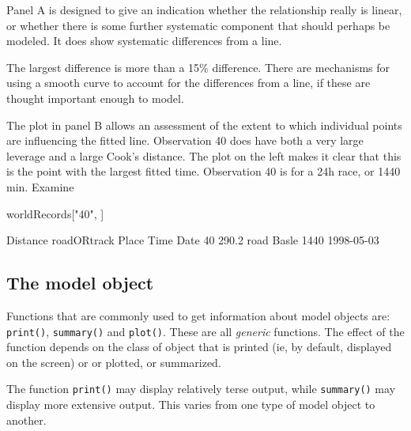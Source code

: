 \documentclass{tufte-book}\usepackage[]{graphicx}\usepackage[]{color}
\newcommand{\txtt}[1]{\texttt{#1}}
\begin{document}
Panel A is designed
to give an indication whether the relationship really is linear, or
whether there is some further systematic component that should perhaps
be modeled.  It does show systematic differences from a line.

The largest difference is more than a 15\% difference. There are
mechanisms for using a smooth curve to account for the differences
from a line, if these are thought important enough to model.

The plot in panel B allows an assessment of the extent to which individual
points are influencing the fitted line.  Observation 40 does have both
a very large leverage and a large Cook's distance.  The plot on the
left makes it clear that this is the point with the largest fitted
time. Observation 40 is for a 24h race, or 1440 min. Examine
\begin{Schunk}
\begin{Sinput}
worldRecords["40", ]
\end{Sinput}
\begin{Soutput}
   Distance roadORtrack Place Time       Date
40    290.2        road Basle 1440 1998-05-03
\end{Soutput}
\end{Schunk}

\subsection{The model object}\label{ss:modobj}

Functions that are commonly used to get information
about model objects are: \txtt{print()}, \txtt{summary()} and
\txtt{plot()}.  These are all \textit{generic} functions. The effect
of the function depends on the class of object that is printed (ie, by
default, displayed on the screen) or or plotted, or summarized.

The function \txtt{print()} may display relatively terse
output, while \txtt{summary()} may display more extensive output.
This varies from one type of model object to another.
\end{document}
